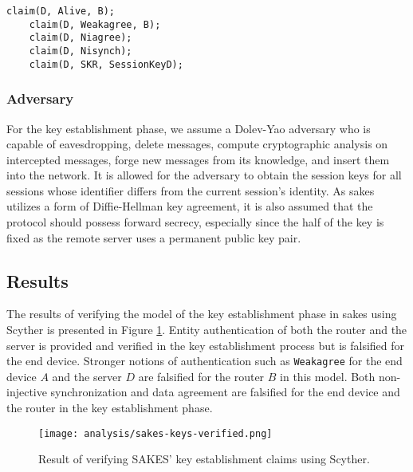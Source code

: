 \begin{lstlisting}[caption={Security claims for role D during key establishment in SAKES.}, label={lst:claims-d-sakes-key}, style=code-listings]
	claim(D, Alive, B);
	claim(D, Weakagree, B);
	claim(D, Niagree);
	claim(D, Nisynch);
	claim(D, SKR, SessionKeyD);
\end{lstlisting}

\subsubsection{Adversary}

For the key establishment phase, we assume a Dolev-Yao adversary who is capable of eavesdropping, delete messages, compute cryptographic analysis on intercepted messages, forge new messages from its knowledge, and insert them into the network. It is allowed for the adversary to obtain the session keys for all sessions whose identifier differs from the current session's identity. As \gls{sakes} utilizes a form of Diffie-Hellman key agreement, it is also assumed that the protocol should possess forward secrecy, especially since the half of the key is fixed as the remote server uses a permanent public key pair.

\subsection{Results}
\label{subsec:sakes-keys-results}

The results of verifying the model of the key establishment phase in \gls{sakes} using Scyther is presented in Figure \ref{fig:sakes-verified-keys}. Entity authentication of both the router and the server is provided and verified in the key establishment process but is falsified for the end device. Stronger notions of authentication such as \texttt{Weakagree} for the end device $A$ and the server $D$ are falsified for the router $B$ in this model. Both non-injective synchronization and data agreement are falsified for the end device and the router in the key establishment phase.

\begin{figure}[h]
	\centering
	\texttt{[image: analysis/sakes-keys-verified.png]}
	\caption{Result of verifying SAKES' key establishment claims using Scyther.}
	\label{fig:sakes-verified-keys}
\end{figure}

